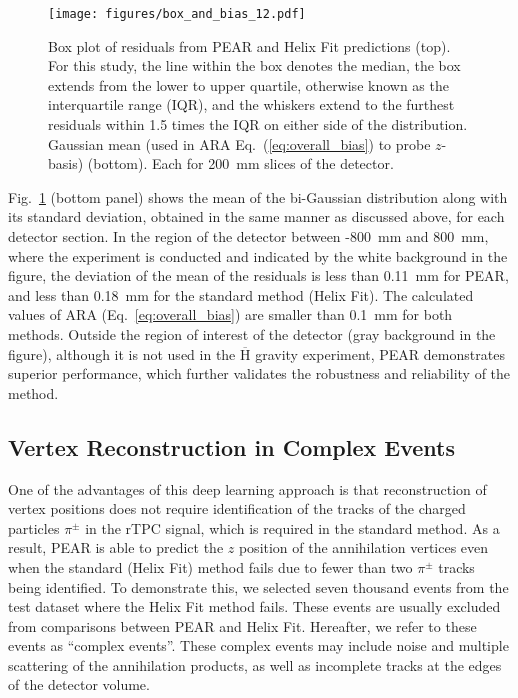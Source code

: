 \documentclass[a4paper,11pt]{article}
\begin{document}
\begin{figure}[htbp]
    \centering
    \texttt{[image: figures/box\_and\_bias\_12.pdf]}
    \caption{\label{figs:box_and_bias}Box plot of residuals from PEAR and Helix Fit predictions (top). For this study, the line within the box denotes the median, the box extends from the lower to upper quartile, otherwise known as the interquartile range (IQR), and the whiskers extend to the furthest residuals within 1.5 times the IQR on either side of the distribution. Gaussian mean (used in ARA Eq.~(\ref{eq:overall_bias}) to probe $z$-basis) (bottom). Each for 200~mm slices of the detector.}
\end{figure} 

Fig.~\ref{figs:box_and_bias} (bottom panel) shows the mean of the bi-Gaussian distribution along with its standard deviation, obtained in the same manner as discussed above, for each detector section. In the region of the detector between -800~mm and 800~mm, where the experiment is conducted and indicated by the white background in the figure, the deviation of the mean of the residuals is less than 0.11~mm for PEAR, and less than 0.18~mm for the standard method (Helix Fit). The calculated values of ARA (Eq.~\ref{eq:overall_bias}) are smaller than 0.1~mm for both methods. Outside the region of interest of the detector (gray background in the figure), although it is not used in the $\overline{\mathrm{H}}$ gravity experiment, PEAR demonstrates superior performance, which further validates the robustness and reliability of the method.

\subsection{Vertex Reconstruction in Complex Events\label{subsec:complexevents}}
One of the advantages of this deep learning approach is that reconstruction of vertex positions does not require identification of the tracks of the charged particles $\pi^\pm$ in the rTPC signal, which is required in the standard method. As a result, PEAR is able to predict the $z$ position of the annihilation vertices even when the standard (Helix Fit) method fails due to fewer than two $\pi^\pm$ tracks being identified. To demonstrate this, we selected seven thousand events from the test dataset where the Helix Fit method fails. These events are usually excluded from comparisons between PEAR and Helix Fit. Hereafter, we refer to these events as ``complex events''. These complex events may include noise and multiple scattering of the annihilation products, as well as incomplete tracks at the edges of the detector volume.
\end{document}

